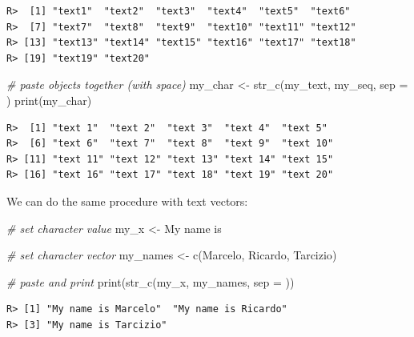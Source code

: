 \documentclass[
  12pt,
]{book}
\newenvironment{Shaded}{\begin{snugshade}}{\end{snugshade}}
\newcommand{\AttributeTok}[1]{\textcolor[rgb]{0.61,0.61,0.61}{#1}}
\newcommand{\CommentTok}[1]{\textcolor[rgb]{0.37,0.37,0.37}{\textit{#1}}}
\newcommand{\FunctionTok}[1]{\textcolor[rgb]{0,0,0}{#1}}
\newcommand{\NormalTok}[1]{#1}
\newcommand{\OtherTok}[1]{\textcolor[rgb]{0.37,0.37,0.37}{#1}}
\newcommand{\StringTok}[1]{\textcolor[rgb]{0.5,0.5,0.5}{#1}}
\begin{document}
\begin{verbatim}
R>  [1] "text1"  "text2"  "text3"  "text4"  "text5"  "text6" 
R>  [7] "text7"  "text8"  "text9"  "text10" "text11" "text12"
R> [13] "text13" "text14" "text15" "text16" "text17" "text18"
R> [19] "text19" "text20"
\end{verbatim}

\begin{Shaded}
\begin{Highlighting}[]
\CommentTok{\# paste objects together (with space)}
\NormalTok{my\_char }\OtherTok{\textless{}{-}} \FunctionTok{str\_c}\NormalTok{(my\_text, }
\NormalTok{                 my\_seq, }
                 \AttributeTok{sep =} \StringTok{\textquotesingle{} \textquotesingle{}}\NormalTok{)}
\FunctionTok{print}\NormalTok{(my\_char)}
\end{Highlighting}
\end{Shaded}

\begin{verbatim}
R>  [1] "text 1"  "text 2"  "text 3"  "text 4"  "text 5" 
R>  [6] "text 6"  "text 7"  "text 8"  "text 9"  "text 10"
R> [11] "text 11" "text 12" "text 13" "text 14" "text 15"
R> [16] "text 16" "text 17" "text 18" "text 19" "text 20"
\end{verbatim}

We can do the same procedure with text vectors:

\begin{Shaded}
\begin{Highlighting}[]
\CommentTok{\# set character value}
\NormalTok{my\_x }\OtherTok{\textless{}{-}} \StringTok{\textquotesingle{}My name is\textquotesingle{}}

\CommentTok{\# set character vector}
\NormalTok{my\_names }\OtherTok{\textless{}{-}} \FunctionTok{c}\NormalTok{(}\StringTok{\textquotesingle{}Marcelo\textquotesingle{}}\NormalTok{, }\StringTok{\textquotesingle{}Ricardo\textquotesingle{}}\NormalTok{, }\StringTok{\textquotesingle{}Tarcizio\textquotesingle{}}\NormalTok{)}

\CommentTok{\# paste and print}
\FunctionTok{print}\NormalTok{(}\FunctionTok{str\_c}\NormalTok{(my\_x, my\_names, }\AttributeTok{sep =} \StringTok{\textquotesingle{} \textquotesingle{}}\NormalTok{))}
\end{Highlighting}
\end{Shaded}

\begin{verbatim}
R> [1] "My name is Marcelo"  "My name is Ricardo" 
R> [3] "My name is Tarcizio"
\end{verbatim}
\end{document}
